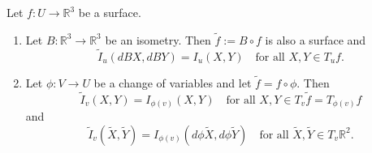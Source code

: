 Let $f: U \rightarrow \mathbb{R}^3$ be a surface.

\begin{enumerate}
\item[i)] Let $B: \mathbb{R}^3 \rightarrow \mathbb{R}^3$ be an isometry. Then $\tilde{f} := B \circ f$ is also a surface and
$$\tilde{I}_u(dB X, dB Y) = I_u(X, Y) \quad \text{for all } X, Y \in T_u f.$$

\item[ii)] Let $\phi: V \rightarrow U$ be a change of variables and let $\tilde{f} = f \circ \phi$. Then
$$\tilde{I}_v(X, Y) = I_{\phi(v)}(X, Y) \quad \text{for all } X, Y \in T_v \tilde{f} = T_{\phi(v)} f$$
and
$$\tilde{I}_v(\tilde{X}, \tilde{Y}) = I_{\phi(v)}(d\phi \tilde{X}, d\phi \tilde{Y}) \quad \text{for all } \tilde{X}, \tilde{Y} \in T_v \mathbb{R}^2.$$
\end{enumerate}